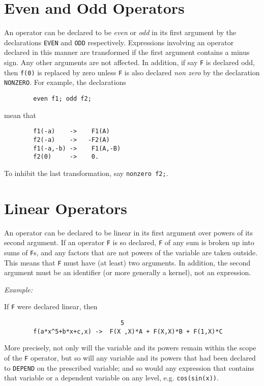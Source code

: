 \section{Even and Odd Operators}
An operator can be declared to be {\em even\/} or {\em odd\/} in its first
argument by the declarations {\tt EVEN} and
{\tt ODD} respectively.  Expressions involving an operator
declared in this manner are transformed if the first argument contains a
minus sign.  Any other arguments are not affected.  In addition, if say
{\tt F} is declared odd, then {\tt f(0)} is replaced by zero unless
{\tt F} is also declared {\em non zero\/} by the declaration
{\tt NONZERO}.  For example, the declarations
\begin{verbatim}
        even f1; odd f2;
\end{verbatim}
mean that
\begin{verbatim}
        f1(-a)    ->    F1(A)
        f2(-a)    ->   -F2(A)
        f1(-a,-b) ->    F1(A,-B)
        f2(0)     ->    0.
\end{verbatim}
To inhibit the last transformation, say {\tt nonzero f2;}.

\section{Linear Operators}
An operator can be declared to be linear in its first argument over powers
of its second argument.  If an operator {\tt F} is so declared, {\tt F} of
any sum is broken up into sums of {\tt F}s, and any factors that are not
powers of the variable are taken outside.  This means that {\tt F} must
have (at least) two arguments.  In addition, the second argument must be
an identifier (or more generally a kernel), not an expression.

{\it Example:}

If {\tt F} were declared linear, then
\begin{verbatim}
                                5
        f(a*x^5+b*x+c,x) ->  F(X ,X)*A + F(X,X)*B + F(1,X)*C
\end{verbatim}
More precisely, not only will the variable and its powers remain within the
scope of the {\tt F} operator, but so will any variable and its powers that
had been declared to {\tt DEPEND} on the prescribed variable; and so would
any expression that contains that variable or a dependent variable on any
level, e.g. {\tt cos(sin(x))}.

